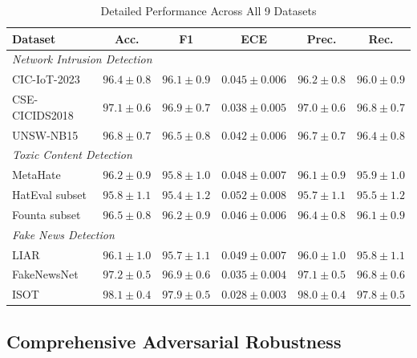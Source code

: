 \documentclass[12pt,a4paper]{article}
\theoremstyle{definition}
\begin{document}
\begin{table}[H]
\caption{Detailed Performance Across All 9 Datasets}
\label{tab:detailed_performance}
\centering
\footnotesize
\setlength{\tabcolsep}{3pt}
\begin{tabular}{@{}lccccc@{}}
\toprule
\textbf{Dataset} & \textbf{Acc.} & \textbf{F1} & \textbf{ECE} & \textbf{Prec.} & \textbf{Rec.} \\
\midrule
\multicolumn{6}{l}{\textit{Network Intrusion Detection}} \\
CIC-IoT-2023 & $96.4 \pm 0.8$ & $96.1 \pm 0.9$ & $0.045 \pm 0.006$ & $96.2 \pm 0.8$ & $96.0 \pm 0.9$ \\
CSE-CICIDS2018 & $97.1 \pm 0.6$ & $96.9 \pm 0.7$ & $0.038 \pm 0.005$ & $97.0 \pm 0.6$ & $96.8 \pm 0.7$ \\
UNSW-NB15 & $96.8 \pm 0.7$ & $96.5 \pm 0.8$ & $0.042 \pm 0.006$ & $96.7 \pm 0.7$ & $96.4 \pm 0.8$ \\
\midrule
\multicolumn{6}{l}{\textit{Toxic Content Detection}} \\
MetaHate & $96.2 \pm 0.9$ & $95.8 \pm 1.0$ & $0.048 \pm 0.007$ & $96.1 \pm 0.9$ & $95.9 \pm 1.0$ \\
HatEval subset & $95.8 \pm 1.1$ & $95.4 \pm 1.2$ & $0.052 \pm 0.008$ & $95.7 \pm 1.1$ & $95.5 \pm 1.2$ \\
Founta subset & $96.5 \pm 0.8$ & $96.2 \pm 0.9$ & $0.046 \pm 0.006$ & $96.4 \pm 0.8$ & $96.1 \pm 0.9$ \\
\midrule
\multicolumn{6}{l}{\textit{Fake News Detection}} \\
LIAR & $96.1 \pm 1.0$ & $95.7 \pm 1.1$ & $0.049 \pm 0.007$ & $96.0 \pm 1.0$ & $95.8 \pm 1.1$ \\
FakeNewsNet & $97.2 \pm 0.5$ & $96.9 \pm 0.6$ & $0.035 \pm 0.004$ & $97.1 \pm 0.5$ & $96.8 \pm 0.6$ \\
ISOT & $98.1 \pm 0.4$ & $97.9 \pm 0.5$ & $0.028 \pm 0.003$ & $98.0 \pm 0.4$ & $97.8 \pm 0.5$ \\
\bottomrule
\end{tabular}
\end{table}

\subsection{Comprehensive Adversarial Robustness}
\end{document}
